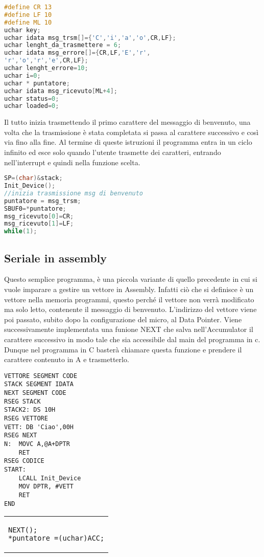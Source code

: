 \documentclass[main.tex]{subfiles}
\begin{document}
\begin{lstlisting}[language=C, caption=Variabili globali]
#define CR 13
#define LF 10
#define ML 10
uchar key;
uchar idata msg_trsm[]={'C','i','a','o',CR,LF};
uchar lenght_da_trasmettere = 6;
uchar idata msg_errore[]={CR,LF,'E','r',
'r','o','r','e',CR,LF};
uchar lenght_errore=10;
uchar i=0;
uchar * puntatore;
uchar idata msg_ricevuto[ML+4];
uchar status=0;
uchar loaded=0;
\end{lstlisting}
Il tutto inizia trasmettendo il primo carattere del messaggio di benvenuto, una volta che la trasmissione è stata completata si passa al carattere successivo e così via fino alla fine.
Al termine di queste istruzioni il programma entra in un ciclo infinito ed esce solo quando l'utente trasmette dei caratteri, entrando nell'interrupt e quindi nella funzione scelta. 
\begin{lstlisting}[language=C, caption=main]
SP=(char)&stack;
Init_Device();
//inizia trasmissione msg di benvenuto
puntatore = msg_trsm; 
SBUF0=*puntatore;
msg_ricevuto[0]=CR;
msg_ricevuto[1]=LF;
while(1);
\end{lstlisting}

\subsection{Seriale in assembly}

Questo semplice programma, è una piccola variante di quello precedente in cui si vuole imparare a gestire un vettore in Assembly. Infatti ciò che si definisce è un vettore nella memoria programmi, questo perché il vettore non verrà modificato ma solo letto, contenente il messaggio di benvenuto. L'indirizzo del vettore viene poi passato, subito dopo la configurazione del micro, al Data Pointer. Viene successivamente implementata una funione NEXT che salva nell'Accumulator il carattere successivo in modo tale che sia accessibile dal main del programma in c. Dunque nel programma in C basterà chiamare questa funzione e prendere il carattere contenuto in A e trasmetterlo. 


\begin{minipage}{0.50\textwidth}
\begin{lstlisting}[caption=Vettore in Assembly]
VETTORE SEGMENT CODE
STACK SEGMENT IDATA
NEXT SEGMENT CODE
RSEG STACK
STACK2: DS 10H
RSEG VETTORE
VETT: DB 'Ciao',00H
RSEG NEXT
N:	MOVC A,@A+DPTR
    RET
RSEG CODICE
START:
	LCALL Init_Device
	MOV DPTR, #VETT
	RET
END
\end{lstlisting}
\end{minipage}%
\hfill
\begin{minipage}{0.50\textwidth}
\begin{tabular}{|p{\textwidth}}
\begin{lstlisting}[caption=codice in C]
NEXT();
*puntatore =(uchar)ACC;
\end{lstlisting}
\end{tabular}
\end{minipage}%
\end{document}
